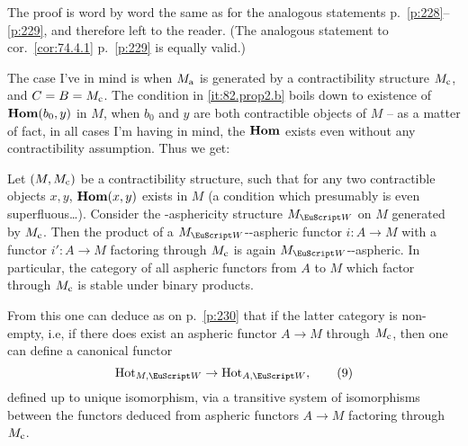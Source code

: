The proof is word by word the same as for the analogous statements p.\
\ref{p:228}--\ref{p:229}, and therefore left to the reader. (The
analogous statement to cor.\ \ref{cor:74.4.1} p.\ \ref{p:229} is
equally valid.)

The case I've in mind is when $M_{\mathrm{a}}$ is generated by a
contractibility structure $M_{\mathrm{c}}$, and $C=B=M_{\mathrm{c}}$. The condition in
\ref{it:82.prop2.b} boils down to existence of $\operatorname{\mathbf{Hom}}(b_0,y)$ in $M$,
when $b_0$ and $y$ are both contractible objects of $M$ -- as a matter
of fact, in all cases I'm having in mind, the $\operatorname{\mathbf{Hom}}$ exists even
without any contractibility assumption. Thus we get:
\begin{corollary}
  Let $(M,M_{\mathrm{c}})$ be a contractibility structure, such that for any
  two contractible objects $x,y$, $\operatorname{\mathbf{Hom}}(x,y)$ exists in $M$ \textup(a
  condition which presumably is even
  superfluous\ldots\textup). Consider the \scrW-asphericity structure
  $M_\scrW$ on $M$ generated by $M_{\mathrm{c}}$. Then the product of a
  $M_\scrW$-\scrW-aspheric functor $i:A\to M$ with a functor $i':A\to
  M$ factoring through $M_{\mathrm{c}}$ is again $M_\scrW$-\scrW-aspheric. In
  particular, the category of all aspheric functors from $A$ to $M$
  which factor through $M_{\mathrm{c}}$ is stable under binary products.
\end{corollary}

From this one can deduce as on p.\ \ref{p:230} that if the latter
category is non-empty, i.e, if there does exist an aspheric functor
$A\to M$ through $M_{\mathrm{c}}$, then one can define a canonical functor
\begin{equation}
  \label{eq:82.9}
  \HotOf_{M,\scrW} \to \HotOf_{A,\scrW},\tag{9}
\end{equation}
defined up to unique isomorphism, via a transitive system of
isomorphisms between the functors deduced from aspheric functors $A\to
M$ factoring through $M_{\mathrm{c}}$.

